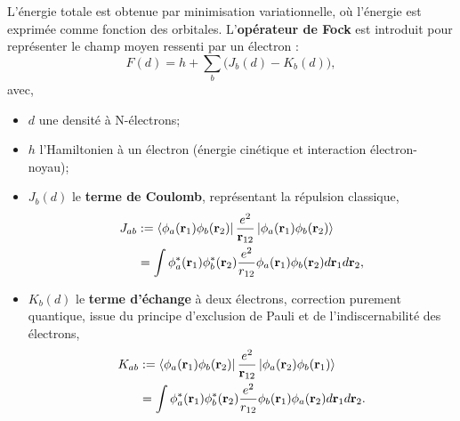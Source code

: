 \documentclass[12pt,a4paper]{article} %
\numberwithin{equation}{section} %
\numberwithin{figure}{section} %
\numberwithin{table}{section} %
\begin{document}
L'énergie totale est obtenue par minimisation variationnelle, où l'énergie est exprimée comme fonction des orbitales. L'\textbf{opérateur de Fock} est introduit pour représenter le champ moyen ressenti par un électron :
\begin{equation}
F(d) = h + \sum_b \big(J_b(d) - K_b(d)\big) ,
\end{equation}
avec,
\begin{itemize}
\item $d$ une densité à N-électrons;
\item $h$ l'Hamiltonien à un électron (énergie cinétique et interaction électron-noyau);
\item  $J_b(d)$ le \textbf{terme de Coulomb}, représentant la répulsion classique,
    \begin{equation}
\begin{split}
        J_{ab} &:=\bra{\phi_a(\vb{r}_1)\phi_b(\vb{r}_2)}\frac{e^2}{\vb{r}_{12}}
        \ket{\phi_a(\vb{r}_1)\phi_b(\vb{r}_2)}\\
        &= \int \phi_a^*(\mathbf{r}_1) \phi_b^*(\mathbf{r}_2) \frac{e^2}{r_{12}} \phi_a(\mathbf{r}_1) \phi_b(\mathbf{r}_2) d\mathbf{r}_1 d\mathbf{r}_2,
\end{split}
    \end{equation}
\item $K_b(d)$ le \textbf{terme d’échange} à deux électrons, correction purement quantique, issue du principe d'exclusion de Pauli et de l'indiscernabilité des électrons,
    \begin{equation}
    \begin{split}
    K_{ab} & :=\bra{\phi_a(\vb{r}_1)\phi_b(\vb{r}_2)}\frac{e^2}{\vb{r}_{12}}
    \ket{\phi_a(\vb{r}_2)\phi_b(\vb{r}_1)}\\
    &= \int \phi_a^*(\mathbf{r}_1) \phi_b^*(\mathbf{r}_2) \frac{e^2}{r_{12}} \phi_b(\mathbf{r}_1) \phi_a(\mathbf{r}_2) d\mathbf{r}_1 d\mathbf{r}_2.
    \end{split}
    \end{equation}
\end{itemize}
\end{document}
